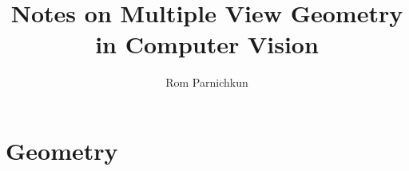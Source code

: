 \documentclass[twocolumn]{article}
\begin{document}
\title{Notes on Multiple View Geometry in Computer Vision}
\author{Rom Parnichkun}

\maketitle

\section{Geometry}
\end{document}
